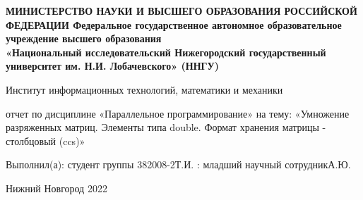 \documentclass[12pt,a4paper]{article}
\title{}
\author{}
\date{}
\begin{document}
\begin{titlepage}
    \newpage
    \begin{center}
    {\bfseries МИНИСТЕРСТВО НАУКИ И ВЫСШЕГО ОБРАЗОВАНИЯ РОССИЙСКОЙ ФЕДЕРАЦИИ
Федеральное государственное автономное образовательное учреждение
высшего образования
 \\
    «Национальный исследовательский
Нижегородский государственный университет им. Н.И. Лобачевского»
(ННГУ)
}

     Институт информационных технологий, математики и механики \\
    \end{center}

    \vspace{1.2em}

    \begin{center}
    \Large отчет \linebreak по дисциплине «Параллельное программирование» \linebreak на тему: \linebreak
«Умножение разряженных матриц. Элементы типа double. Формат хранения матрицы - столбцовый (ccs)»

    \end{center}

    \vspace{5em}


    \begin{flushright}
                       Выполнил(а):
                       студент группы 382008-2 Т.И.\underline{\hspace{3cm}} \linebreak{}: младший научный сотрудник А.Ю.\underline{\hspace{3cm}} 
    \end{flushright}


    \vspace{\fill}

    \begin{center}
    Нижний Новгород 2022
    \end{center}

    \end{titlepage}
    
\maketitle
\end{document}
